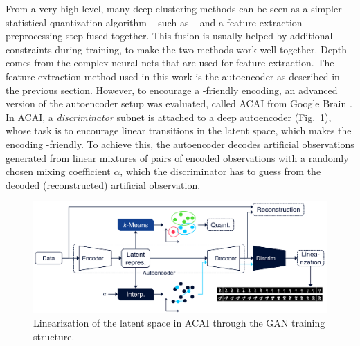 			From a very high level, many deep clustering methods can be seen as a simpler statistical quantization algorithm -- such as \kmeans{} -- and a feature-extraction preprocessing step fused together.
			This fusion is usually helped by additional constraints during training, to make the two methods work well together.
			Depth comes from the complex neural nets that are used for feature extraction.
			The feature-extraction method used in this work is the autoencoder as described in the previous section.
			However, to encourage a \kmeans{}-friendly encoding, an advanced version of the autoencoder setup was evaluated, called \ac{ACAI} from Google Brain \cite{acai}.
			In \ac{ACAI}, a \textit{discriminator} subnet is attached to a deep autoencoder (Fig.~\ref{fig:acai_interpolation}), whose task is to encourage linear transitions in the latent space, which makes the encoding \kmeans{}-friendly.
			To achieve this, the autoencoder decodes artificial observations generated from linear mixtures of pairs of encoded observations with a randomly chosen mixing coefficient $\alpha$, which the discriminator has to guess from the decoded (reconstructed) artificial observation.
			
			\begin{figure}[ht]
				\centering
				\includegraphics[width=\linewidth]{figures/04_ema/acai_interpolation/acai_interpolation.pdf}
				\caption[Illustration of the ACAI algorithm]{Linearization of the latent space in ACAI through the GAN training structure.}
				\label{fig:acai_interpolation}
			\end{figure}
			
